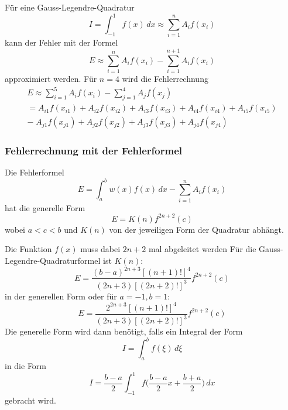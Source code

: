 \noindent
Für eine Gauss-Legendre-Quadratur 
\begin{equation}
    I 
    = 
    \int_{-1}^{1}f(x)\,dx 
    \approx 
    \sum_{i=1}^{n}A_{i}f(x_{i})
\end{equation}
\noindent
kann der Fehler mit der Formel
\begin{equation}
    E 
    \approx 
    \sum_{i=1}^{n}A_{i}f(x_{i})
    -
    \sum_{i=1}^{n+1}A_{i}f(x_{i})
\end{equation}
\noindent
approximiert werden. Für $n = 4$ wird die Fehlerrechnung 
\begin{gather*}
    E
    \approx
    \sum_{i=1}^{5}A_{i}f(x_{i})
    -
    \sum_{j=1}^{4}A_{j}f(x_{j}) \\
    =
    A_{i1}f(x_{i1})+A_{i2}f(x_{i2})+A_{i3}f(x_{i3})+A_{i4}f(x_{i4})+A_{i5}f(x_{i5}) \\
    -\;
    A_{j1}f(x_{j1})+A_{j2}f(x_{j2})+A_{j3}f(x_{j3})+A_{j4}f(x_{j4})
\end{gather*}
\newpage

\subsubsection{Fehlerrechnung mit der Fehlerformel}
Die Fehlerformel
\begin{equation}
    E = \int_{a}^{b} w(x) f(x) \, dx - \sum_{i=1}^{n}A_{i}f(x_{i})    
\end{equation} 
\noindent
hat die generelle Form
\begin{equation}
    E = K(n)f^{2n+2}(c)
\end{equation}
\noindent
wobei $a<c<b$ und $K(n)$ von der jeweiligen Form der Quadratur abhängt.
\newline

\noindent
Die Funktion $f(x)$ muss dabei $2n+2$ mal abgeleitet werden
\noindent
Für die Gauss-Legendre-Quadraturformel ist $K(n)$:
\begin{equation}
    E = \frac{(b-a)^{2n+3}[(n+1)!]^{4}}{(2n+3)[(2n+2)!]^{3}}f^{2n+2}(c)
\end{equation}
\noindent
in der generellen Form oder für $a=-1, b=1$:
\begin{equation}
    E = \frac{2^{2n+3}[(n+1)!]^{4}}{(2n+3)[(2n+2)!]^{3}}f^{2n+2}(c)
\end{equation}
\noindent
Die generelle Form wird dann benötigt, falls ein Integral der Form 
\begin{equation}
    I = \int_{a}^{b} f(\xi) \,d\xi
\end{equation}
\noindent
in die Form
\begin{equation}
    I = \frac{b-a}{2} \int_{-1}^{1} f\bigg(\frac{b-a}{2}x + \frac{b+a}{2}\bigg) \,dx
\end{equation}
\noindent
gebracht wird.
\newline

